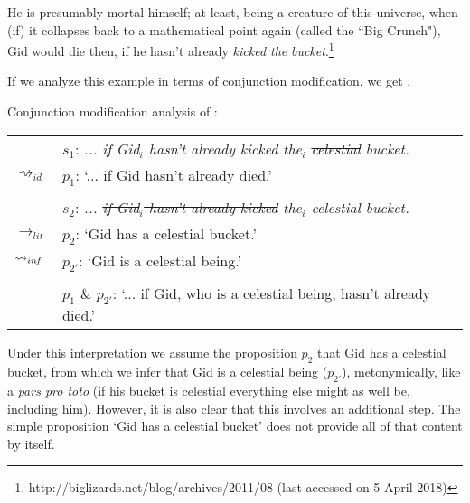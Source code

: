 \documentclass[output=paper]{langsci/langscibook}
\begin{document}
\ea \label{celestial bucket}
He is presumably mortal himself; at least, being a creature of this universe, when (if) it collapses back to a mathematical point again (called the ``Big Crunch"), Gid would die then, if he hasn't already \textit{kicked the} \underline{} \textit{bucket}.\footnote{http://biglizards.net/blog/archives/2011/08 (last accessed on 5 April 2018)}
\z

\noindent If we analyze this example in terms of conjunction modification, we get .

\ea \label{analysis1 celestial bucket} 
Conjunction modification analysis of : \\
\vspace{5pt}
\begin{tabular}{ll}
								& 	$s_{1}$: \hspace{4pt} \textit{... if Gid$_{i}$ hasn't already kicked the$_{i}$ \sout{celestial} bucket.} \\
$\rightsquigarrow_{id}$				&	$p_{1}$: \hspace{1pt} `... if Gid hasn't already died.' \\
\vspace{-5pt} \\
								& 	$s_{2}$: \hspace{4pt} \textit{... \sout{if Gid$_{i}$ hasn't already kicked} the$_{i}$ celestial bucket.} \\
$\rightarrow_{lit}$					&	$p_{2}$: \hspace{1pt} `Gid has a celestial bucket.' \\
$\rightsquigarrow_{in\hspace{-0.8pt} f}$	&	$p_{2'}$: \hspace{-1.5pt} `Gid is a celestial being.' \\
\vspace{-5pt} \\
								&	$p_{1}$ \& $p_{2'}$: `... if Gid, who is a celestial being, hasn't already died.' 
\end{tabular}
\z

\noindent Under this interpretation we assume the proposition $p_{2}$ that Gid has a celestial bucket, from which we infer that Gid is a celestial being ($p_{2'}$), metonymically, like a \textit{pars pro toto} (if his bucket is celestial everything else might as well be, %
including him). However, it is also clear that this involves an additional step. The simple proposition `Gid has a celestial bucket' does not provide all of that content by itself. 
\end{document}
